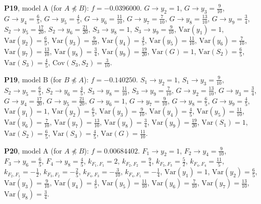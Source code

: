 \documentclass[10pt,a4paper]{article}
\newcommand{\nnest}{\not\preceq}
\begin{document}
{\noindent\textbf{P19}, model A (for $A\nnest B$): $f=-0.0396000$. {\footnotesize $G\to y_{2}=1$, $G\to y_{3}=\tfrac{9}{10}$, $G\to y_{4}=\tfrac{6}{5}$, $G\to y_{5}=\tfrac{4}{5}$, $G\to y_{6}=\tfrac{11}{10}$, $G\to y_{7}=\tfrac{7}{10}$, $G\to y_{8}=\tfrac{13}{10}$, $G\to y_{9}=\tfrac{3}{4}$, $S_{2}\to y_{5}=\tfrac{17}{20}$, $S_{2}\to y_{6}=\tfrac{21}{20}$, $S_{3}\to y_{8}=1$, $S_{3}\to y_{9}=\tfrac{9}{10}$, $\mathrm{Var}(y_{1})=1$, $\mathrm{Var}(y_{2})=\tfrac{6}{5}$, $\mathrm{Var}(y_{3})=\tfrac{9}{10}$, $\mathrm{Var}(y_{4})=\tfrac{4}{5}$, $\mathrm{Var}(y_{5})=\tfrac{11}{10}$, $\mathrm{Var}(y_{6})=\tfrac{7}{10}$, $\mathrm{Var}(y_{7})=\tfrac{13}{10}$, $\mathrm{Var}(y_{8})=\tfrac{3}{4}$, $\mathrm{Var}(y_{9})=\tfrac{19}{20}$, $\mathrm{Var}(G)=1$, $\mathrm{Var}(S_{2})=\tfrac{6}{5}$, $\mathrm{Var}(S_{3})=\tfrac{4}{5}$, $\mathrm{Cov}(S_{3},S_{2})=\tfrac{3}{10}$.}\par\smallskip
\noindent\textbf{P19}, model B (for $B\nnest A$): $f=-0.140250$. {\footnotesize $S_{1}\to y_{2}=1$, $S_{1}\to y_{3}=\tfrac{9}{10}$, $S_{2}\to y_{5}=\tfrac{6}{5}$, $S_{2}\to y_{6}=\tfrac{4}{5}$, $S_{3}\to y_{8}=\tfrac{11}{10}$, $S_{3}\to y_{9}=\tfrac{7}{10}$, $G\to y_{2}=\tfrac{13}{10}$, $G\to y_{3}=\tfrac{3}{4}$, $G\to y_{4}=\tfrac{17}{20}$, $G\to y_{5}=\tfrac{21}{20}$, $G\to y_{6}=1$, $G\to y_{7}=\tfrac{9}{10}$, $G\to y_{8}=\tfrac{6}{5}$, $G\to y_{9}=\tfrac{4}{5}$, $\mathrm{Var}(y_{1})=1$, $\mathrm{Var}(y_{2})=\tfrac{6}{5}$, $\mathrm{Var}(y_{3})=\tfrac{9}{10}$, $\mathrm{Var}(y_{4})=\tfrac{4}{5}$, $\mathrm{Var}(y_{5})=\tfrac{11}{10}$, $\mathrm{Var}(y_{6})=\tfrac{7}{10}$, $\mathrm{Var}(y_{7})=\tfrac{13}{10}$, $\mathrm{Var}(y_{8})=\tfrac{3}{4}$, $\mathrm{Var}(y_{9})=\tfrac{19}{20}$, $\mathrm{Var}(S_{1})=1$, $\mathrm{Var}(S_{2})=\tfrac{6}{5}$, $\mathrm{Var}(S_{3})=\tfrac{4}{5}$, $\mathrm{Var}(G)=\tfrac{11}{10}$.}\par\smallskip
\noindent\textbf{P20}, model A (for $A\nnest B$): $f=0.00684402$. {\footnotesize $F_{1}\to y_{2}=1$, $F_{2}\to y_{4}=\tfrac{9}{10}$, $F_{3}\to y_{6}=\tfrac{6}{5}$, $F_{4}\to y_{8}=\tfrac{4}{5}$, $k_{F_{1},F_{1}}=2$, $k_{F_{2},F_{2}}=\tfrac{9}{4}$, $k_{F_{3},F_{3}}=\tfrac{5}{2}$, $k_{F_{4},F_{4}}=\tfrac{11}{5}$, $k_{F_{2},F_{1}}=-\tfrac{1}{2}$, $k_{F_{3},F_{2}}=-\tfrac{2}{5}$, $k_{F_{4},F_{3}}=-\tfrac{3}{10}$, $k_{F_{4},F_{1}}=-\tfrac{1}{4}$, $\mathrm{Var}(y_{1})=1$, $\mathrm{Var}(y_{2})=\tfrac{6}{5}$, $\mathrm{Var}(y_{3})=\tfrac{9}{10}$, $\mathrm{Var}(y_{4})=\tfrac{4}{5}$, $\mathrm{Var}(y_{5})=\tfrac{11}{10}$, $\mathrm{Var}(y_{6})=\tfrac{7}{10}$, $\mathrm{Var}(y_{7})=\tfrac{13}{10}$, $\mathrm{Var}(y_{8})=\tfrac{3}{4}$.}\par\smallskip
}
\end{document}
